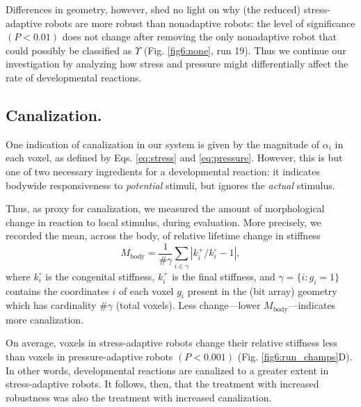 Differences in geometry, however, shed no light on why (the reduced) stress-adaptive robots are more robust than nonadaptive robots:
the level of significance $(P<0.01)$ does not change after removing the only nonadaptive robot that could possibly be classified as $\Upsilon$ (Fig. \ref{fig6:none}, run 19). 
Thus we continue our investigation by analyzing how stress and pressure might differentially affect the rate of developmental reactions.


\subsection*{Canalization.}

One indication of canalization \citep{waddington1942canalization,kriegman2018morphological} in our system is given by the magnitude of $\alpha_i$ in each voxel, as defined by Eqs. \ref{eq:stress} and \ref{eq:pressure}.
However, this is but one of two necessary ingredients for a developmental reaction: it indicates bodywide responsiveness to \textit{potential} stimuli, but ignores the \textit{actual} stimulus.

Thus, as proxy for canalization, we measured the amount of morphological change in reaction to local stimulus, during evaluation.
More precisely, we recorded the mean, across the body, of relative lifetime change in stiffness
\begin{equation}
\label{eq:mu}
M_{\text{body}} = \frac{1}{\#\gamma} \sum_{i \in \gamma} \left| k_i^{+}/k_i^{\circ}-1 \right| ,
\end{equation}
where 
$k_i^{\circ}$ 
is the congenital stiffness,
$k_i^{+}$ is the final stiffness, and
$\gamma = \{i : g_i = 1 \}$ contains the coordinates $i$ of each voxel $g_i$ present in the (bit array) geometry which has cardinality $\#\gamma$ (total voxels). 
Less change---lower $M_{\text{body}}$---indicates more canalization.

On average, voxels in stress-adaptive robots change their relative stiffness less than voxels in pressure-adaptive robots $(P<0.001)$ (Fig. \ref{fig6:run_champs}D).
In other words, developmental reactions are canalized to a greater extent in stress-adaptive robots.
It follows, then, that the treatment with increased robustness was also the treatment with increased canalization.

